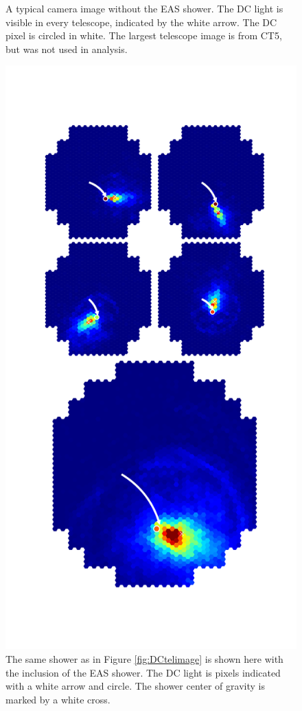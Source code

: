 \documentclass[]{article}
\begin{document}
\begin{figure}
\begin{minipage}{0.45\textwidth}
\caption{A typical camera image without the EAS shower. The DC light is visible in every telescope, indicated by the white arrow. The DC pixel is circled in white. The largest telescope image is from CT5, but was not used in analysis.}
\label{fig:DCtelimage}
\end{minipage}\hfill
\begin{minipage}{0.45\textwidth}
\centering
\includegraphics[trim=80 120 80 150,clip,width=\textwidth]{graphfull}
\caption{The same shower as in Figure \ref{fig:DCtelimage} is shown here with the inclusion of the EAS shower. The DC light is pixels indicated with a white arrow and circle. The shower center of gravity is marked by a white cross.}
\label{fig:cutdistribution2}
\end{minipage}
\restoregeometry
\end{figure}
\end{document}
